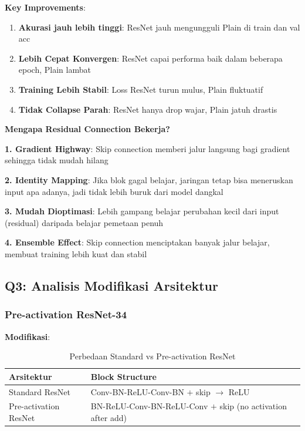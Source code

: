 \textbf{Key Improvements}:
\begin{enumerate}
    \item \textbf{Akurasi jauh lebih tinggi}: ResNet jauh mengungguli Plain di train dan val acc
    
    \item \textbf{Lebih Cepat Konvergen}: ResNet capai performa baik dalam beberapa epoch, Plain lambat
    
    \item \textbf{Training Lebih Stabil}: Loss ResNet turun mulus, Plain fluktuatif
    
    \item \textbf{Tidak Collapse Parah}: ResNet hanya drop wajar, Plain jatuh drastis
\end{enumerate}

\textbf{Mengapa Residual Connection Bekerja?}

\textbf{1. Gradient Highway}: Skip connection memberi jalur langsung bagi gradient sehingga tidak mudah hilang

\textbf{2. Identity Mapping}: Jika blok gagal belajar, jaringan tetap bisa meneruskan input apa adanya, jadi tidak lebih buruk dari model dangkal

\textbf{3. Mudah Dioptimasi}: Lebih gampang belajar perubahan kecil dari input (residual) daripada belajar pemetaan penuh

\textbf{4. Ensemble Effect}: Skip connection menciptakan banyak jalur belajar, membuat training lebih kuat dan stabil

\FloatBarrier

\subsection{Q3: Analisis Modifikasi Arsitektur}

\subsubsection{Pre-activation ResNet-34}

\textbf{Modifikasi}:

\begin{table}[h]
\centering
\caption{Perbedaan Standard vs Pre-activation ResNet}
\scriptsize
\begin{tabular}{|l|p{10cm}|}
\hline
\textbf{Arsitektur} & \textbf{Block Structure} \\
\hline
Standard ResNet & Conv-BN-ReLU-Conv-BN $+$ skip $\rightarrow$ ReLU \\
\hline
Pre-activation ResNet & BN-ReLU-Conv-BN-ReLU-Conv $+$ skip (no activation after add) \\
\hline
\end{tabular}
\end{table}

